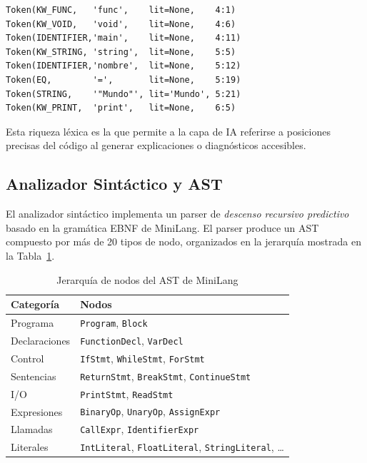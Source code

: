 \documentclass[conference]{IEEEtran}
\begin{document}
\begin{lstlisting}[language={},numbers=none,caption={Flujo de tokens anotado de hello.ml}]
Token(KW_FUNC,   'func',    lit=None,    4:1)
Token(KW_VOID,   'void',    lit=None,    4:6)
Token(IDENTIFIER,'main',    lit=None,    4:11)
Token(KW_STRING, 'string',  lit=None,    5:5)
Token(IDENTIFIER,'nombre',  lit=None,    5:12)
Token(EQ,        '=',       lit=None,    5:19)
Token(STRING,    '"Mundo"', lit='Mundo', 5:21)
Token(KW_PRINT,  'print',   lit=None,    6:5)
\end{lstlisting}

Esta riqueza léxica es la que permite a la capa de IA referirse a posiciones precisas del código al generar explicaciones o diagnósticos accesibles.

\subsection{Analizador Sintáctico y AST}

El analizador sintáctico implementa un parser de \textit{descenso recursivo predictivo} basado en la gramática EBNF de MiniLang. El parser produce un AST compuesto por más de 20 tipos de nodo, organizados en la jerarquía mostrada en la Tabla~\ref{tab:nodos}.

\begin{table}[h]
\caption{Jerarquía de nodos del AST de MiniLang}
\label{tab:nodos}
\centering
\begin{tabular}{ll}
\hline
\textbf{Categoría} & \textbf{Nodos} \\
\hline
Programa & \texttt{Program}, \texttt{Block} \\
Declaraciones & \texttt{FunctionDecl}, \texttt{VarDecl} \\
Control & \texttt{IfStmt}, \texttt{WhileStmt}, \texttt{ForStmt} \\
Sentencias & \texttt{ReturnStmt}, \texttt{BreakStmt}, \texttt{ContinueStmt} \\
I/O & \texttt{PrintStmt}, \texttt{ReadStmt} \\
Expresiones & \texttt{BinaryOp}, \texttt{UnaryOp}, \texttt{AssignExpr} \\
Llamadas & \texttt{CallExpr}, \texttt{IdentifierExpr} \\
Literales & \texttt{IntLiteral}, \texttt{FloatLiteral}, \texttt{StringLiteral}, \ldots \\
\hline
\end{tabular}
\end{table}
\end{document}
